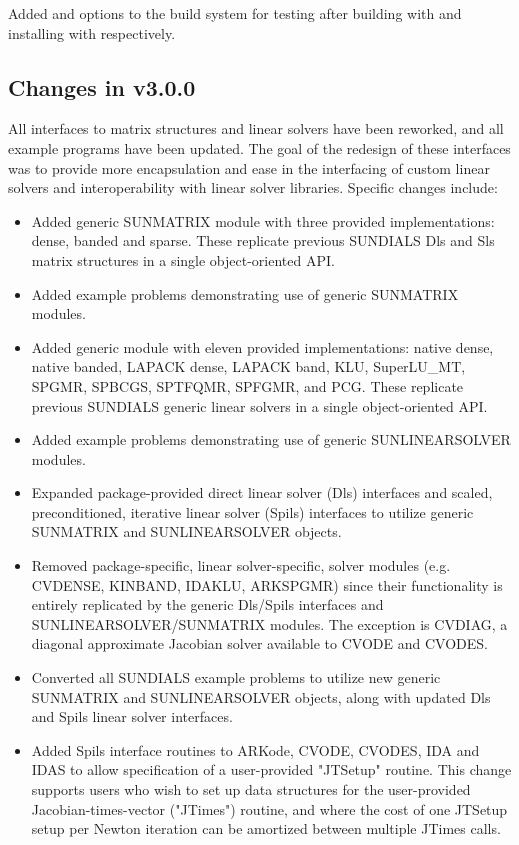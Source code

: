 Added  and  options to the build
system for testing {\sundials} after building with  and
installing with  respectively.

\subsection*{Changes in v3.0.0}

All interfaces to matrix structures and linear solvers 
have been reworked, and all example programs have been updated. 
The goal of the redesign of these interfaces was to provide more encapsulation
and ease in the interfacing of custom linear solvers and interoperability 
with linear solver libraries.
Specific changes include:
\begin{itemize}
\item Added generic SUNMATRIX module with three provided implementations:
        dense, banded and sparse.  These replicate previous SUNDIALS Dls and
        Sls matrix structures in a single object-oriented API.
\item Added example problems demonstrating use of generic SUNMATRIX modules.
\item Added generic  module with eleven provided
        implementations: {\sundials} native dense, {\sundials} native banded, 
        LAPACK dense, LAPACK band, KLU,
        SuperLU\_MT, SPGMR, SPBCGS, SPTFQMR, SPFGMR, and PCG.  These replicate
        previous SUNDIALS generic linear solvers in a single object-oriented
        API.
\item Added example problems demonstrating use of generic SUNLINEARSOLVER
        modules.
\item Expanded package-provided direct linear solver (Dls) interfaces and
        scaled, preconditioned, iterative linear solver (Spils) interfaces
        to utilize generic SUNMATRIX and SUNLINEARSOLVER objects.
\item Removed package-specific, linear solver-specific, solver modules
        (e.g. CVDENSE, KINBAND, IDAKLU, ARKSPGMR) since their functionality
        is entirely replicated by the generic Dls/Spils interfaces and
        SUNLINEARSOLVER/SUNMATRIX modules.  The exception is CVDIAG, a
        diagonal approximate Jacobian solver available to CVODE and CVODES.
\item Converted all SUNDIALS example problems to utilize new generic
        SUNMATRIX and SUNLINEARSOLVER objects, along with updated Dls and
        Spils linear solver interfaces.
\item Added Spils interface routines to ARKode, CVODE, CVODES, IDA and
        IDAS to allow specification of a user-provided "JTSetup" routine.
        This change supports users who wish to set up data structures for
        the user-provided Jacobian-times-vector ("JTimes") routine, and
        where the cost of one JTSetup setup per Newton iteration can be
        amortized between multiple JTimes calls.
\end{itemize}

